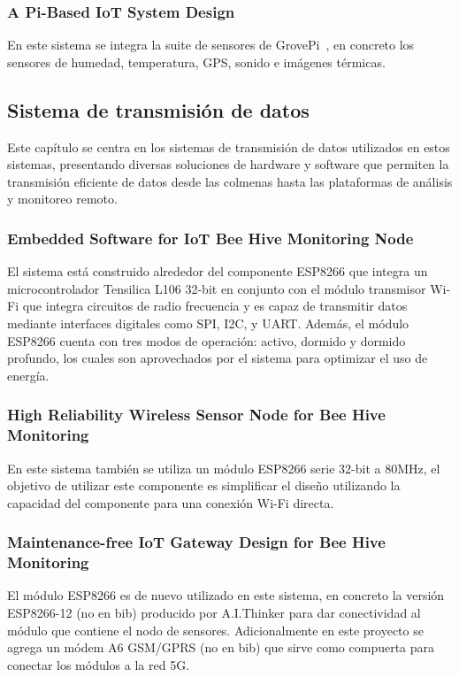 \subsubsection{A Pi-Based IoT System Design}
En este sistema se integra la suite de sensores de GrovePi~\cite{chen_chien_hsu_jing_lin_lin_2020}, en concreto los sensores de humedad, temperatura, GPS, sonido e imágenes térmicas.~\cite{chen_chien_hsu_jing_lin_lin_2020}

\subsection{Sistema de transmisión de datos}
Este capítulo se centra en los sistemas de transmisión de datos utilizados en estos sistemas, presentando diversas soluciones de hardware y software que permiten la transmisión eficiente de datos desde las colmenas hasta las plataformas de análisis y monitoreo remoto.

\subsubsection{Embedded Software for IoT Bee Hive Monitoring Node}
El sistema está construido alrededor del componente ESP8266 que integra un microcontrolador Tensilica L106 32-bit en conjunto con el módulo transmisor Wi-Fi que integra circuitos de radio frecuencia y es capaz de transmitir datos mediante interfaces digitales como SPI, I2C, y UART. Además, el módulo ESP8266 cuenta con tres modos de operación: activo, dormido y dormido profundo, los cuales son aprovechados por el sistema para optimizar el uso de energía.~\cite{vidrascu_svasta_2017a}

\subsubsection{High Reliability Wireless Sensor Node for Bee Hive Monitoring}
En este sistema también se utiliza un módulo ESP8266 serie 32-bit a 80MHz, el objetivo de utilizar este componente es simplificar el diseño utilizando la capacidad del componente para una conexión Wi-Fi directa.~\cite{vidrascu_svasta_vladescu_2016}

\subsubsection{Maintenance-free IoT Gateway Design for Bee Hive Monitoring}
El módulo ESP8266 es de nuevo utilizado en este sistema, en concreto la versión ESP8266-12 (no en bib) producido por A.I.Thinker para dar conectividad al módulo que contiene el nodo de sensores. Adicionalmente en este proyecto se agrega un módem A6 GSM/GPRS (no en bib) que sirve como compuerta para conectar los módulos a la red 5G.~\cite{vidrascu_svasta_2017b}

